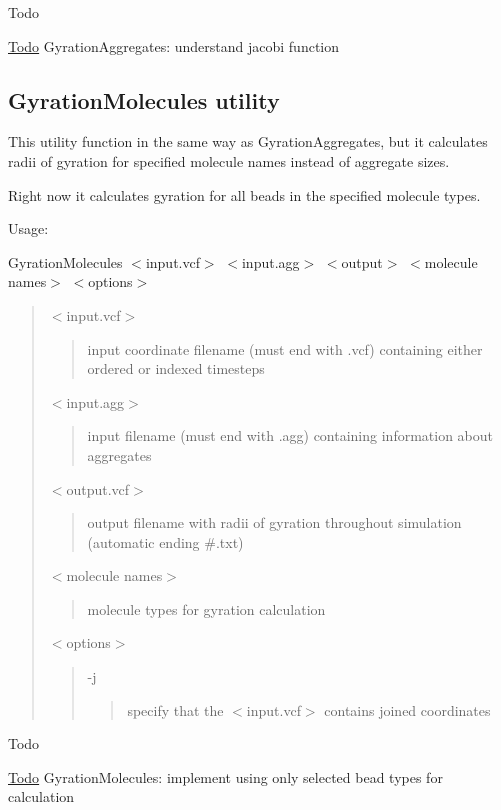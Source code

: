 \begin{DoxyRefDesc}{Todo}
\item[\hyperlink{todo__todo000003}{Todo}]Gyration\+Aggregates\+: understand {\ttfamily jacobi} function\end{DoxyRefDesc}
\hypertarget{Common_GyrationMolecules}{}\subsection{Gyration\+Molecules utility}\label{Common_GyrationMolecules}
This utility function in the same way as Gyration\+Aggregates, but it calculates radii of gyration for specified molecule names instead of aggregate sizes.

Right now it calculates gyration for all beads in the specified molecule types.

Usage\+:

{\ttfamily Gyration\+Molecules $<$input.\+vcf$>$ $<$input.\+agg$>$ $<$output$>$ $<$molecule names$>$ $<$options$>$}

\begin{quote}
{\ttfamily $<$input.\+vcf$>$} \begin{quote}
input coordinate filename (must end with {\ttfamily .vcf}) containing either ordered or indexed timesteps \end{quote}
{\ttfamily $<$input.\+agg$>$} \begin{quote}
input filename (must end with {\ttfamily .agg}) containing information about aggregates \end{quote}
{\ttfamily $<$output.\+vcf$>$} \begin{quote}
output filename with radii of gyration throughout simulation (automatic ending \#.txt) \end{quote}
{\ttfamily $<$molecule names$>$} \begin{quote}
molecule types for gyration calculation \end{quote}
{\ttfamily $<$options$>$} \begin{quote}
{\ttfamily -\/j} \begin{quote}
specify that the {\ttfamily $<$input.\+vcf$>$} contains joined coordinates \end{quote}
\end{quote}
\end{quote}


\begin{DoxyRefDesc}{Todo}
\item[\hyperlink{todo__todo000004}{Todo}]Gyration\+Molecules\+: implement using only selected bead types for calculation\end{DoxyRefDesc}


